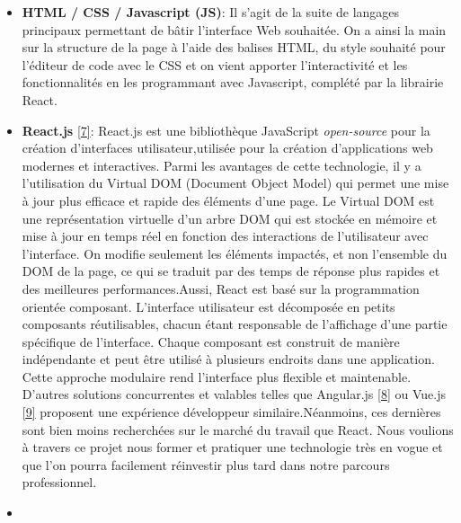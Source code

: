 \documentclass[12pt]{article}
\begin{document}
\iffalse                            
\begin{itemize}
  \item
        \textbf{HTML / CSS / Javascript (JS)}: Il s'agit de la suite de
        langages principaux permettant de bâtir l'interface Web souhaitée. On
        a ainsi la main sur la structure de la page à l'aide des balises HTML,
        du style souhaité pour l'éditeur de code avec le CSS et on vient
        apporter l'interactivité et les fonctionnalités en les programmant
        avec Javascript, complété par la librairie React.
  \item
        \textbf{React.js} \protect\hyperlink{ref-react}{{[}7{]}}: React.js est
        une bibliothèque JavaScript \emph{open-source} pour la création
        d'interfaces utilisateur,utilisée pour la création d'applications web
        modernes et interactives. Parmi les avantages de cette technologie, il
        y a l'utilisation du Virtual DOM (Document Object Model) qui permet
        une mise à jour plus efficace et rapide des éléments d'une page. Le
        Virtual DOM est une représentation virtuelle d'un arbre DOM qui est
        stockée en mémoire et mise à jour en temps réel en fonction des
        interactions de l'utilisateur avec l'interface. On modifie seulement
        les éléments impactés, et non l'ensemble du DOM de la page, ce qui se
        traduit par des temps de réponse plus rapides et des meilleures
        performances.\newline  Aussi, React est basé sur la programmation
        orientée composant. L'interface utilisateur est décomposée en petits
        composants réutilisables, chacun étant responsable de l'affichage
        d'une partie spécifique de l'interface. Chaque composant est construit
        de manière indépendante et peut être utilisé à plusieurs endroits dans
        une application. Cette approche modulaire rend l'interface plus
        flexible et maintenable. D'autres solutions concurrentes et valables
        telles que Angular.js \protect\hyperlink{ref-angularjs}{{[}8{]}} ou
        Vue.js \protect\hyperlink{ref-vuejs}{{[}9{]}} proposent une expérience
        développeur similaire.\newline  Néanmoins, ces dernières sont bien
        moins recherchées sur le marché du travail que React. Nous voulions à
        travers ce projet nous former et pratiquer une technologie très en
        vogue et que l'on pourra facilement réinvestir plus tard dans notre
        parcours professionnel.
  \item

\end{itemize}
\end{document}
